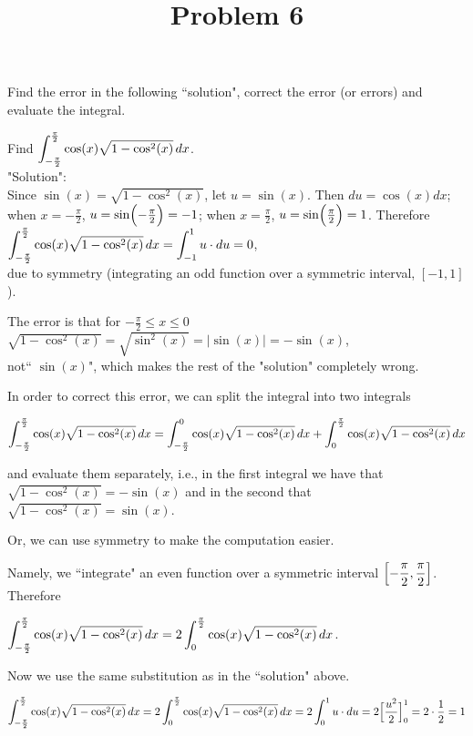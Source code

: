 \documentclass{ximera}
\title[Problem 6]{Problem 6}
\begin{document}
\begin{abstract} \end{abstract}
\maketitle


\begin{problem}
Find the error in the following ``solution", correct the error (or errors) and evaluate the integral.

Find $\displaystyle \int_{-\frac{\pi}{2}}^{\frac{\pi}{2}} \cos(x)\sqrt{1-\cos^2(x)}\,d x$.\\[1em]
"Solution":\\[1em]
Since $\sin(x)=\sqrt{1-\cos^2(x)}$, let $u=\sin(x)$. Then $du=\cos(x)dx$; \\[1em]
when $x=-\frac{\pi}{2}$, $u=\sin\Bigl(-\frac{\pi}{2}\Bigr)=-1$; when $x=\frac{\pi}{2}$, $u=\sin\Bigl(\frac{\pi}{2}\Bigr)=1$. Therefore\\[1em]
	$\displaystyle \int_{-\frac{\pi}{2}}^{\frac{\pi}{2}} \cos(x)\sqrt{1-\cos^2(x)}\,d x=\displaystyle \int_{-1}^{1}u \cdot du=0$,\\[1em] due to symmetry (integrating an odd function over a symmetric interval, $[-1,1]$).

\begin{explanation}

	The error is that   for $-\frac{\pi}{2}\le x\le 0$  \\
	$\sqrt{1-\cos^2(x)}=\sqrt{\sin^2(x)}=|\sin(x)|=-\sin(x)$,\\
	 not`` $\sin(x)$", which makes the rest of the "solution" completely wrong.

	In order to correct this error, we can split the integral into two integrals 

	$\displaystyle \int_{-\frac{\pi}{2}}^{\frac{\pi}{2}} \cos(x)\sqrt{1-\cos^2(x)}\,d x=\displaystyle \int_{-\frac{\pi}{2}}^{0} \cos(x)\sqrt{1-\cos^2(x)}\,d x+\displaystyle \int_{0}^{\frac{\pi}{2}} \cos(x)\sqrt{1-\cos^2(x)}\,d x$

	and evaluate them separately, i.e., in the first integral we have that $\sqrt{1-\cos^2(x)}=-\sin(x)$  and in the second that $\sqrt{1-\cos^2(x)}=\sin(x)$.

	Or, we can use symmetry to make the computation easier. 
	
	Namely, we ``integrate" an even function over a symmetric interval $\Bigl[-\dfrac{\pi}{2},\dfrac{\pi}{2}\Bigr]$. Therefore

	$\displaystyle \int_{-\frac{\pi}{2}}^{\frac{\pi}{2}} \cos(x)\sqrt{1-\cos^2(x)}\,d x=2\displaystyle \int_{0}^{\frac{\pi}{2}} \cos(x)\sqrt{1-\cos^2(x)}\,d x$.

	Now we use the same substitution as in the ``solution" above.

	$\displaystyle \int_{-\frac{\pi}{2}}^{\frac{\pi}{2}} \cos(x)\sqrt{1-\cos^2(x)}\,d x=2\displaystyle \int_{0}^{\frac{\pi}{2}} \cos(x)\sqrt{1-\cos^2(x)}\,d x=2\displaystyle \int_{0}^{1}u \cdot du=2\Bigl[\dfrac{u^2}{2}\Bigr]_{0}^{1}=2\cdot \dfrac{1}{2}=1$
	\end{explanation}
\end{problem}
\end{document}
